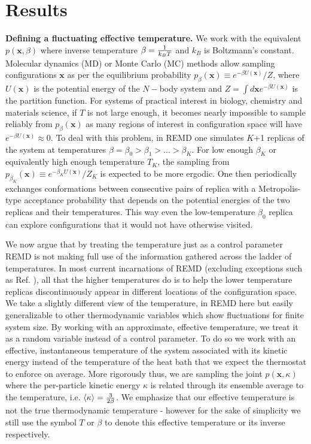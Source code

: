 \section{Results}

\textbf{Defining a fluctuating effective temperature.} We work with the equivalent $p(\mathbf{x},\beta)$ where inverse temperature $\beta = {1 \over k_B T}$ and $k_B$ is Boltzmann's constant. Molecular dynamics (MD) or Monte Carlo (MC) methods allow sampling configurations $\mathbf{x}$ as per the equilibrium probability $p_{\beta}(\mathbf{x}) \equiv {e^{-\beta U(\mathbf{x})} /  Z}$, where $U(\mathbf{x})$ is the potential energy of the $N-$body system and $Z = \int d\mathbf{x} e^{-\beta U(\mathbf{x})}$ is the partition function. For systems of practical interest in biology, chemistry and materials science,  if $T$ is not large enough, it becomes nearly impossible to sample reliably from $p_{\beta}(\mathbf{x})$ as many regions of interest in configuration space will have $e^{-\beta U(\mathbf{x})} \approx 0$. To deal with this problem, in REMD one simulates $K$+1 replicas of the system at temperatures $\beta = \beta_0 > \beta_1 > ... > \beta_K $. For low enough $\beta_K $ or equivalently high enough temperature $T_K$, the sampling from $p_{\beta_K}(\mathbf{x}) \equiv {e^{-\beta_K U(\mathbf{x})} /  Z_K}$ is expected to be more ergodic. One then periodically exchanges conformations between consecutive pairs of replica with a Metropolis-type acceptance probability that depends on the potential energies of the two replicas and their temperatures. This way even the low-temperature $\beta_0$ replica can explore configurations that it would not have otherwise visited. 

We now argue that by treating the temperature just as a control parameter REMD is not making full use of the information gathered across the ladder of temperatures. In  most current incarnations of REMD (excluding exceptions such as Ref. \cite{gallicchio2005temperature}), all that the higher temperatures do is to help the lower temperature replicas discontinuously appear in different locations of the configuration space. We take a slightly different view of the temperature, in REMD here but easily generalizable to other thermodynamic variables which show fluctuations for finite system size. By working with an approximate, effective temperature, we treat it as a random variable instead of a control parameter. To do so we work with an effective, instantaneous temperature of the system associated with its kinetic energy instead of the temperature of the heat bath that we expect the thermostat to enforce on average. More rigorously thus, we are sampling the joint $p(\mathbf{x},\kappa)$ where the per-particle kinetic energy $\kappa$ is related through its ensemble average to the temperature, i.e. $\langle \kappa \rangle = {3 \over 2\beta} $. We emphasize that our effective temperature is not the true thermodynamic temperature - however for the sake of simplicity we still use the symbol $T$ or $\beta$ to denote this effective temperature or its inverse respectively.

